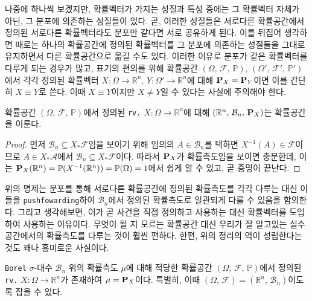 나중에 하나씩 보겠지만, 확률벡터가 가지는 성질과 특성 중에는 그 확률벡터 자체가 아닌, 그 분포에 의존하는 성질들이 있다. 곧, 이러한 성질들은 서로다른 확률공간에서 정의된 서로다른 확률벡터라도 분포만 같다면 서로 공유하게 된다. 이를 뒤집어 생각하면 때로는 하나의 확률공간에 정의된 확률벡터를 그 분포에 의존하는 성질들을 그대로 유지하면서 다른 확률공간으로 옮길 수도 있다. 이러한 이유로 분포가 같은 확률벡터를 다루게 되는 경우가 많고, 표기의 편의를 위해 확률공간 $(\Omega,\,\mathcal{F},\,\mathbb{P}),\,(\Omega',\,\mathcal{F}',\,\mathbb{P}')$에서 각각 정의된 확률벡터 $X:\Omega\to\mathbb{R}^n,\,Y:\Omega'\to\mathbb{R}^n$에 대해 $\mathbf{P}_X=\mathbf{P}_Y$이면 이를 간단히 $X\equiv Y$로 쓴다. 이때 $X\equiv Y$이지만 $X\ne Y$일 수 있다는 사실에 주의해야 한다.

\begin{proposition}\label{prop:rvProbSpace}
    확률공간 $(\Omega,\,\mathcal{F},\,\mathbb{P})$에서 정의된 \texttt{rv.} $X:\Omega\to\mathbb{R}^n$에 대해 $(\mathbb{R}^n,\,\mathcal{B}_n,\,\mathbf{P}_X)$는 확률공간을 이룬다.
\end{proposition}

\begin{proof}
    먼저 $\mathcal{B}_n\subseteq X_*\mathcal{F}$임을 보이기 위해 임의의 $A\in\mathcal{B}_n$를 택하면 $X^{-1}(A)\in\mathcal{F}$이므로 $A\in X_*\mathcal{A}$에서 $\mathcal{B}_n\subseteq X_*\mathcal{F}$이다. 따라서 $\mathbf{P}_X$가 확률측도임을 보이면 충분한데, 이는 $\mathbf{P}_X(\mathbb{R}^n)=\mathbb{P}(X^{-1}(\mathbb{R}^n))=\mathbb{P}(\Omega)=1$에서 쉽게 알 수 있고, 곧 증명이 끝난다.
\end{proof}

위의 명제는 분포를 통해 서로다른 확률공간에 정의된 확률측도를 각각 다루는 대신 이들을 \texttt{pushfowarding}하여 $\mathcal{B}_n$에서 정의된 확률측도로 일관되게 다룰 수 있음을 함의한다. 그리고 생각해보면, 이가 곧 사건을 직접 정의하고 사용하는 대신 확률벡터를 도입하여 사용하는 이유이다. 무엇이 될 지 모르는 확률공간 대신 우리가 잘 알고있는 실수공간에서의 확률측도를 다루는 것이 훨씬 편하다. 한편, 위의 정리의 역이 성립한다는 것도 꽤나 흥미로운 사실이다.

\begin{theorem}\label{thm:probSpaceRv}
    \texttt{Borel} $\sigma$-대수 $\mathcal{B}_n$ 위의 확률측도 $\mu$에 대해 적당한 확률공간 $(\Omega,\,\mathcal{F},\,\mathbb{P})$에서 정의된 \texttt{rv.} $X:\Omega\to\mathbb{R}^n$가 존재하여 $\mu=\mathbf{P}_X$이다. 특별히, 이때 $(\Omega,\,\mathcal{F})=(\mathbb{R}^n,\,\mathcal{B}_n)$이도록 잡을 수 있다.
\end{theorem}

